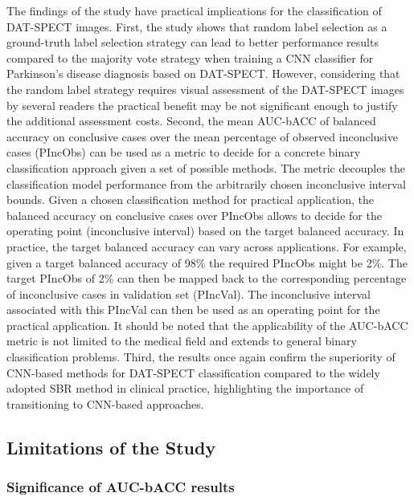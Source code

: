 The findings of the study have practical implications for the classification of DAT-SPECT images.
First, the study shows that random label selection as a ground-truth label selection strategy 
can lead to better performance results compared to the majority vote strategy 
when training a CNN classifier for Parkinson's disease diagnosis based on DAT-SPECT.
However, considering that the random label strategy requires visual assessment of the DAT-SPECT images by several readers 
the practical benefit may be not significant enough to justify the additional assessment costs.
Second, the mean AUC-bACC of balanced accuracy on conclusive cases over the mean percentage of observed inconclusive cases (PIncObs)
can be used as a metric to decide for a concrete binary classification approach given a set of possible methods.
The metric decouples the classification model performance from the arbitrarily chosen inconclusive interval bounds.
Given a chosen classification method for practical application,
the balanced accuracy on conclusive cases over PIncObs allows to decide for the operating point (inconclusive interval)
based on the target balanced accuracy.
In practice, the target balanced accuracy can vary across applications.
For example, given a target balanced accuracy of 98\% the required PIncObs might be 2\%. 
The target PIncObs of 2\% can then be mapped back to the corresponding percentage of inconclusive cases in 
validation set (PIncVal).
The inconclusive interval associated with this PIncVal can then be used 
as an operating point for the practical application.
It should be noted that the applicability of the AUC-bACC metric is not limited to the medical field
and extends to general binary classification problems.
Third, the results once again confirm the superiority of CNN-based methods for DAT-SPECT classification compared to the
widely adopted SBR method in clinical practice, highlighting the importance of transitioning to CNN-based approaches.

\subsection{Limitations of the Study}

\subsubsection{Significance of AUC-bACC results}

